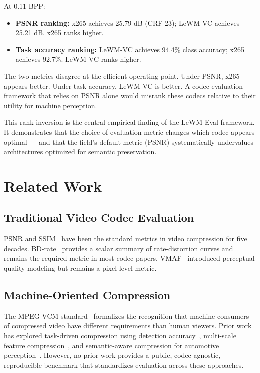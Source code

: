 \documentclass{article}
\begin{document}
At 0.11 BPP:

\begin{itemize}
\item \textbf{PSNR ranking:} x265 achieves 25.79 dB (CRF 23); LeWM-VC achieves 25.21 dB. x265 ranks higher.
\item \textbf{Task accuracy ranking:} LeWM-VC achieves 94.4\% class accuracy; x265 achieves 92.7\%. LeWM-VC ranks higher.
\end{itemize}

The two metrics disagree at the efficient operating point. Under PSNR, x265 appears better. Under task accuracy, LeWM-VC is better. A codec evaluation framework that relies on PSNR alone would misrank these codecs relative to their utility for machine perception.

This rank inversion is the central empirical finding of the LeWM-Eval framework. It demonstrates that the choice of evaluation metric changes which codec appears optimal --- and that the field's default metric (PSNR) systematically undervalues architectures optimized for semantic preservation.

\section{Related Work}
\label{sec:related}

\subsection{Traditional Video Codec Evaluation}
PSNR and SSIM~\cite{wang2004ssim} have been the standard metrics in video compression for five decades. BD-rate~\cite{bjontegaard2001bdrate} provides a scalar summary of rate-distortion curves and remains the required metric in most codec papers. VMAF~\cite{li2016vmaf} introduced perceptual quality modeling but remains a pixel-level metric.

\subsection{Machine-Oriented Compression}
The MPEG VCM standard~\cite{MPEG2023VCM} formalizes the recognition that machine consumers of compressed video have different requirements than human viewers. Prior work has explored task-driven compression using detection accuracy~\cite{duan2020vcm}, multi-scale feature compression~\cite{kim2024multifeature}, and semantic-aware compression for automotive perception~\cite{wang2023semantic}. However, no prior work provides a public, codec-agnostic, reproducible benchmark that standardizes evaluation across these approaches.
\end{document}
